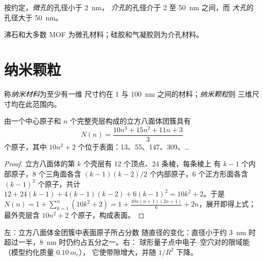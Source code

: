 \begin{definition}[孔径]\label{def:b3:inorganic-materials:pores}
按约定，\emph{微孔}的孔径小于 \qty{2}{nm}，
\emph{介孔}的孔径介于 2 至 \qty{50}{nm} 之间，而
\emph{大孔}的孔径大于 \qty{50}{nm}。
\end{definition}

沸石和大多数 MOF 为微孔材料；硅胶和气凝胶则为介孔材料。

\section{纳米颗粒}

\begin{definition}[纳米材料]\label{def:b3:inorganic-materials:nano}
称\emph{纳米材料}为至少有一维
尺寸约在 1 与 \qty{100}{nm} 之间的材料；\emph{纳米颗粒}则
三维尺寸均在此范围内。
\end{definition}

\begin{proposition}[幻数团簇]\label{prop:b3:inorganic-materials:magic}
由一个中心原子和 $n$ 个完整壳层构成的立方八面体团簇具有
\[
  N(n) = \frac{10n^3 + 15n^2 + 11n + 3}{3}
\]
个原子，其中 $10n^2 + 2$ 个位于表面：13、55、147、309、\dots
\end{proposition}

\begin{proof}
立方八面体的第 $k$ 个壳层有 12 个顶点、24 条棱，每条棱上
有 $k - 1$ 个内部原子，8 个三角面各含 $(k - 1)(k - 2)/2$ 个内部原子，6
个正方形面各含 $(k - 1)^2$ 个原子，共计 $12 + 24(k - 1) + 4(k - 1)(k - 2) + 6(k - 1)^2 = 10k^2 + 2$。于是
$N(n) = 1 + \sum_{k=1}^{n}(10k^2 + 2) = 1 + \frac{10n(n + 1)(2n + 1)}{6} + 2n$，展开即得上式；
最外壳层含 $10n^2 + 2$ 个原子，构成表面。
\end{proof}

\begin{omfigure}

{\small 左：立方八面体金团簇中表面原子所占分数
随直径的变化：直径小于约
\qty{3}{nm} 时超过一半，\qty{8}{nm} 时仍约占五分之一。右：
球形量子点中电子–空穴对的限域能（模型约化质量 $0.10\,m_e$），
它使带隙增大，并随 $1/R^2$ 下降。}
\end{omfigure}

